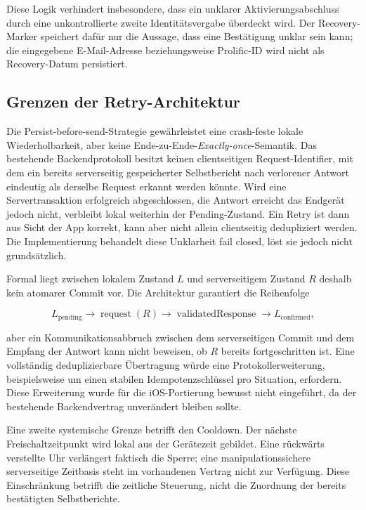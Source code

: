 \begin{neu}
Diese Logik verhindert insbesondere, dass ein unklarer Aktivierungsabschluss durch eine unkontrollierte zweite Identitätsvergabe überdeckt wird. Der Recovery-Marker speichert dafür nur die Aussage, dass eine Bestätigung unklar sein kann; die eingegebene E-Mail-Adresse beziehungsweise Prolific-ID wird nicht als Recovery-Datum persistiert.

\subsection{Grenzen der Retry-Architektur}

Die Persist-before-send-Strategie gewährleistet eine crash-feste lokale Wiederholbarkeit, aber keine Ende-zu-Ende-\emph{Exactly-once}-Semantik. Das bestehende Backendprotokoll besitzt keinen clientseitigen Request-Identifier, mit dem ein bereits serverseitig gespeicherter Selbstbericht nach verlorener Antwort eindeutig als derselbe Request erkannt werden könnte. Wird eine Servertransaktion erfolgreich abgeschlossen, die Antwort erreicht das Endgerät jedoch nicht, verbleibt lokal weiterhin der Pending-Zustand. Ein Retry ist dann aus Sicht der App korrekt, kann aber nicht allein clientseitig dedupliziert werden. Die Implementierung behandelt diese Unklarheit fail closed, löst sie jedoch nicht grundsätzlich.

Formal liegt zwischen lokalem Zustand \(L\) und serverseitigem Zustand \(R\) deshalb kein atomarer Commit vor. Die Architektur garantiert die Reihenfolge

\[
L_{\mathrm{pending}}
\rightarrow
\operatorname{request}(R)
\rightarrow
\operatorname{validatedResponse}
\rightarrow
L_{\mathrm{confirmed}},
\]

aber ein Kommunikationsabbruch zwischen dem serverseitigen Commit und dem Empfang der Antwort kann nicht beweisen, ob \(R\) bereits fortgeschritten ist. Eine vollständig deduplizierbare Übertragung würde eine Protokollerweiterung, beispielsweise um einen stabilen Idempotenzschlüssel pro Situation, erfordern. Diese Erweiterung wurde für die iOS-Portierung bewusst nicht eingeführt, da der bestehende Backendvertrag unverändert bleiben sollte.

Eine zweite systemische Grenze betrifft den Cooldown. Der nächste Freischaltzeitpunkt wird lokal aus der Gerätezeit gebildet. Eine rückwärts verstellte Uhr verlängert faktisch die Sperre; eine manipulationssichere serverseitige Zeitbasis steht im vorhandenen Vertrag nicht zur Verfügung. Diese Einschränkung betrifft die zeitliche Steuerung, nicht die Zuordnung der bereits bestätigten Selbstberichte.


\end{neu}
